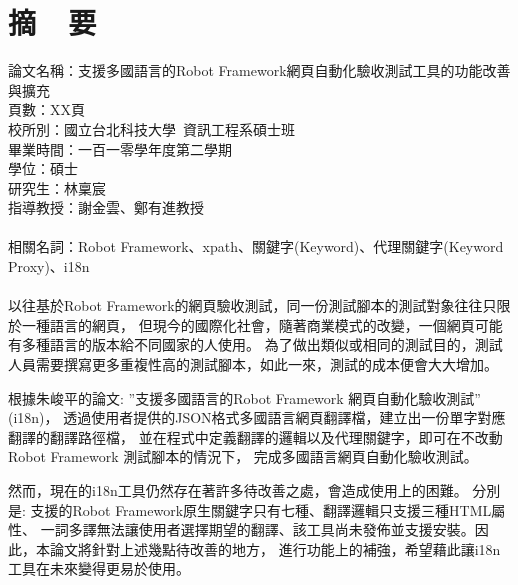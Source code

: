 \chapter*{摘~~要}


\noindent
論文名稱：支援多國語言的Robot Framework網頁自動化驗收測試工具的功能改善與擴充\\
頁數：XX頁\\
校所別：國立台北科技大學~資訊工程系碩士班\\
畢業時間：一百一零學年度第二學期\\
學位：碩士\\
研究生：林稟宸\\
指導教授：謝金雲、鄭有進教授\\
\hspace*{\fill}\\
\noindent
相關名詞：Robot Framework、xpath、關鍵字(Keyword)、代理關鍵字(Keyword Proxy)、i18n\\
\hspace*{\fill}\\
%
\indent
以往基於Robot Framework的網頁驗收測試，同一份測試腳本的測試對象往往只限於一種語言的網頁，
但現今的國際化社會，隨著商業模式的改變，一個網頁可能有多種語言的版本給不同國家的人使用。
為了做出類似或相同的測試目的，測試人員需要撰寫更多重複性高的測試腳本，如此一來，測試的成本便會大大增加。

根據朱峻平的論文: ”支援多國語言的Robot Framework 網頁自動化驗收測試” (i18n)，
透過使用者提供的JSON格式多國語言網頁翻譯檔，建立出一份單字對應翻譯的翻譯路徑檔，
並在程式中定義翻譯的邏輯以及代理關鍵字，即可在不改動Robot Framework 測試腳本的情況下，
完成多國語言網頁自動化驗收測試。

然而，現在的i18n工具仍然存在著許多待改善之處，會造成使用上的困難。
分別是: 支援的Robot Framework原生關鍵字只有七種、翻譯邏輯只支援三種HTML屬性、
一詞多譯無法讓使用者選擇期望的翻譯、該工具尚未發佈並支援安裝。因此，本論文將針對上述幾點待改善的地方，
進行功能上的補強，希望藉此讓i18n工具在未來變得更易於使用。


